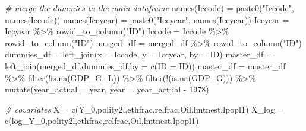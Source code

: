 \documentclass[
]{article}
\newenvironment{Shaded}{\begin{snugshade}}{\end{snugshade}}
\newcommand{\AttributeTok}[1]{\textcolor[rgb]{0.77,0.63,0.00}{#1}}
\newcommand{\CommentTok}[1]{\textcolor[rgb]{0.56,0.35,0.01}{\textit{#1}}}
\newcommand{\DecValTok}[1]{\textcolor[rgb]{0.00,0.00,0.81}{#1}}
\newcommand{\FunctionTok}[1]{\textcolor[rgb]{0.00,0.00,0.00}{#1}}
\newcommand{\NormalTok}[1]{#1}
\newcommand{\OtherTok}[1]{\textcolor[rgb]{0.56,0.35,0.01}{#1}}
\newcommand{\SpecialCharTok}[1]{\textcolor[rgb]{0.00,0.00,0.00}{#1}}
\newcommand{\StringTok}[1]{\textcolor[rgb]{0.31,0.60,0.02}{#1}}
\begin{document}
\begin{Shaded}
\begin{Highlighting}[]
\CommentTok{\# merge the dummies to the main dataframe}
\FunctionTok{names}\NormalTok{(Iccode) }\OtherTok{=} \FunctionTok{paste0}\NormalTok{(}\StringTok{"Iccode"}\NormalTok{, }\FunctionTok{names}\NormalTok{(Iccode))}
\FunctionTok{names}\NormalTok{(Iccyear) }\OtherTok{=} \FunctionTok{paste0}\NormalTok{(}\StringTok{"Iccyear"}\NormalTok{, }\FunctionTok{names}\NormalTok{(Iccyear))}
\NormalTok{Iccyear }\OtherTok{=}\NormalTok{ Iccyear }\SpecialCharTok{\%\textgreater{}\%} \FunctionTok{rowid\_to\_column}\NormalTok{(}\StringTok{"ID"}\NormalTok{)}
\NormalTok{Iccode }\OtherTok{=}\NormalTok{ Iccode }\SpecialCharTok{\%\textgreater{}\%} \FunctionTok{rowid\_to\_column}\NormalTok{(}\StringTok{"ID"}\NormalTok{)}
\NormalTok{merged\_df }\OtherTok{=}\NormalTok{ merged\_df }\SpecialCharTok{\%\textgreater{}\%} \FunctionTok{rowid\_to\_column}\NormalTok{(}\StringTok{"ID"}\NormalTok{)}
\NormalTok{dummies\_df }\OtherTok{=} \FunctionTok{left\_join}\NormalTok{(}\AttributeTok{x =}\NormalTok{ Iccode, }\AttributeTok{y =}\NormalTok{ Iccyear, }\AttributeTok{by =} \StringTok{\textquotesingle{}ID\textquotesingle{}}\NormalTok{)}
\NormalTok{master\_df }\OtherTok{=} \FunctionTok{left\_join}\NormalTok{(merged\_df,dummies\_df,}\AttributeTok{by =} \FunctionTok{c}\NormalTok{(}\StringTok{\textquotesingle{}ID\textquotesingle{}} \OtherTok{=} \StringTok{\textquotesingle{}ID\textquotesingle{}}\NormalTok{))  }
\NormalTok{master\_df }\OtherTok{=}\NormalTok{ master\_df }\SpecialCharTok{\%\textgreater{}\%} 
  \FunctionTok{filter}\NormalTok{(}\SpecialCharTok{!}\FunctionTok{is.na}\NormalTok{(GDP\_G\_L)) }\SpecialCharTok{\%\textgreater{}\%} 
  \FunctionTok{filter}\NormalTok{(}\SpecialCharTok{!}\NormalTok{(}\FunctionTok{is.na}\NormalTok{(GDP\_G))) }\SpecialCharTok{\%\textgreater{}\%} 
  \FunctionTok{mutate}\NormalTok{(}\AttributeTok{year\_actual =}\NormalTok{ year, }\AttributeTok{year =}\NormalTok{ year\_actual }\SpecialCharTok{{-}} \DecValTok{1978}\NormalTok{)}

\CommentTok{\# covariates}
\NormalTok{X }\OtherTok{=} \FunctionTok{c}\NormalTok{(}\StringTok{\textquotesingle{}Y\_0\textquotesingle{}}\NormalTok{,}\StringTok{\textquotesingle{}polity2l\textquotesingle{}}\NormalTok{,}\StringTok{\textquotesingle{}ethfrac\textquotesingle{}}\NormalTok{,}\StringTok{\textquotesingle{}relfrac\textquotesingle{}}\NormalTok{,}\StringTok{\textquotesingle{}Oil\textquotesingle{}}\NormalTok{,}\StringTok{\textquotesingle{}lmtnest\textquotesingle{}}\NormalTok{,}\StringTok{\textquotesingle{}lpopl1\textquotesingle{}}\NormalTok{)}
\NormalTok{X\_log }\OtherTok{=} \FunctionTok{c}\NormalTok{(}\StringTok{\textquotesingle{}log\_Y\_0\textquotesingle{}}\NormalTok{,}\StringTok{\textquotesingle{}polity2l\textquotesingle{}}\NormalTok{,}\StringTok{\textquotesingle{}ethfrac\textquotesingle{}}\NormalTok{,}\StringTok{\textquotesingle{}relfrac\textquotesingle{}}\NormalTok{,}\StringTok{\textquotesingle{}Oil\textquotesingle{}}\NormalTok{,}\StringTok{\textquotesingle{}lmtnest\textquotesingle{}}\NormalTok{,}\StringTok{\textquotesingle{}lpopl1\textquotesingle{}}\NormalTok{)}


\end{Highlighting}
\end{Shaded}
\end{document}
